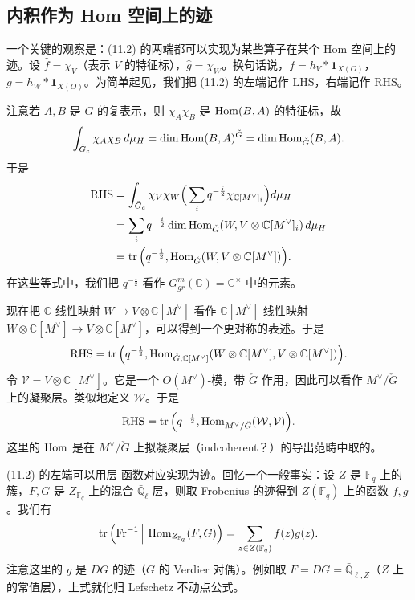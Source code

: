 \subsection{内积作为 Hom 空间上的迹}

一个关键的观察是：(11.2) 的两端都可以实现为某些算子在某个 Hom 空间上的迹。设 $\hat f=\chi_V$（表示 $V$ 的特征标），$\hat g=\chi_W$。换句话说，$f=h_V*\mathbf 1_{X(O)}$，$g=h_W*\mathbf 1_{X(O)}$。为简单起见，我们把 (11.2) 的左端记作 LHS，右端记作 RHS。

注意若 $A,B$ 是 $\check G$ 的复表示，则 $\chi_A\chi_B$ 是 $\operatorname{Hom}(B,A)$ 的特征标，故
\begin{equation}
  \int_{\check G_c}\chi_A\chi_B\,d\mu_H=\dim\operatorname{Hom}(B,A)^{\check G}=\dim\operatorname{Hom}_{\check G}(B,A).
  \label{eq:11-4}
\end{equation}
于是
\begin{align}
  \mathrm{RHS}&=\int_{\check G_c}\chi_V\chi_W\Big(\sum_i q^{-\frac i2}\chi_{\mathbb C[M^\vee]_i}\Big)d\mu_H
  \label{eq:11-5}\\
  &=\sum_i q^{-\frac i2}\dim\operatorname{Hom}_{\check G}(W,V\otimes\mathbb C[M^\vee]_i)\,d\mu_H
  \label{eq:11-6}\\
  &=\operatorname{tr}\Big(q^{-\frac12},\operatorname{Hom}_{\check G}(W,V\otimes\mathbb C[M^\vee])\Big).
  \label{eq:11-7}
\end{align}
在这些等式中，我们把 $q^{-\frac12}$ 看作 $G_{gr}^m(\mathbb C)=\mathbb C^\times$ 中的元素。

现在把 $\mathbb C$-线性映射 $W\to V\otimes\mathbb C[M^\vee]$ 看作 $\mathbb C[M^\vee]$-线性映射 $W\otimes\mathbb C[M^\vee]\to V\otimes\mathbb C[M^\vee]$，可以得到一个更对称的表述。于是
\begin{equation}
  \mathrm{RHS}=\operatorname{tr}\Big(q^{-\frac12},\operatorname{Hom}_{\check G,\mathbb C[M^\vee]}(W\otimes\mathbb C[M^\vee],V\otimes\mathbb C[M^\vee])\Big).
  \label{eq:11-8}
\end{equation}
令 $\mathcal V=V\otimes\mathbb C[M^\vee]$。它是一个 $O(M^\vee)$-模，带 $\check G$ 作用，因此可以看作 $M^\vee/\check G$ 上的凝聚层。类似地定义 $\mathcal W$。于是
\begin{equation}
  \mathrm{RHS}=\operatorname{tr}\Big(q^{-\frac12},\operatorname{Hom}_{M^\vee/\check G}(\mathcal W,\mathcal V)\Big).
  \label{eq:11-9}
\end{equation}
这里的 $\operatorname{Hom}$ 是在 $M^\vee/\check G$ 上拟凝聚层（indcoherent？）的导出范畴中取的。

(11.2) 的左端可以用层-函数对应实现为迹。回忆一个一般事实：设 $Z$ 是 $\mathbb F_q$ 上的簇，$F,G$ 是 $Z_{\mathbb F_q}$ 上的混合 $\bar{\mathbb Q}_\ell$-层，则取 Frobenius 的迹得到 $Z(\mathbb F_q)$ 上的函数 $f,g$。我们有
\begin{equation}
  \operatorname{tr}\Big(\mathrm{Fr}^{-1}\,\Big|\,\operatorname{Hom}_{Z_{\mathbb F_q}}(F,G)\Big)=\sum_{z\in Z(\mathbb F_q)}f(z)g(z).
  \label{eq:11-10}
\end{equation}
注意这里的 $g$ 是 $DG$ 的迹（$G$ 的 Verdier 对偶）。例如取 $F=DG=\bar{\mathbb Q}_{\ell,Z}$（$Z$ 上的常值层），上式就化归 Lefschetz 不动点公式。

